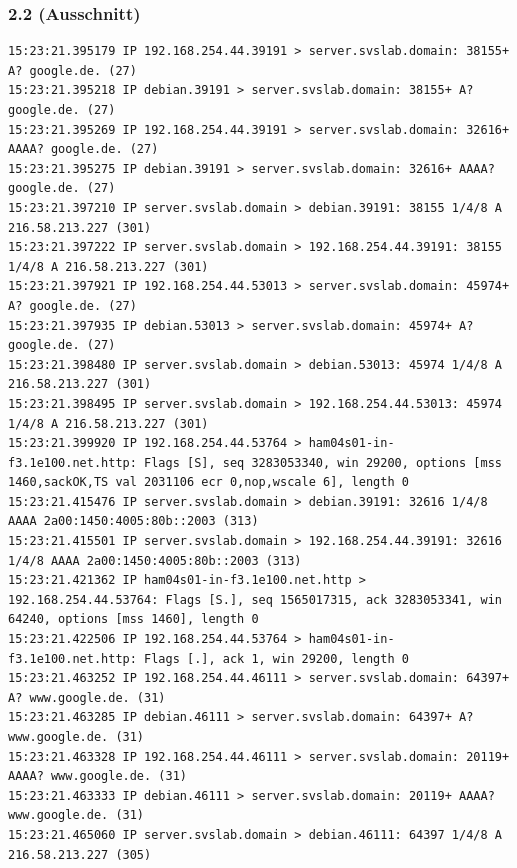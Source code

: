 \documentclass[12pt]{article}
\theoremstyle{plain}
\begin{document}
\subsubsection{2.2 (Ausschnitt)}
\begin{lstlisting}
15:23:21.395179 IP 192.168.254.44.39191 > server.svslab.domain: 38155+ A? google.de. (27)
15:23:21.395218 IP debian.39191 > server.svslab.domain: 38155+ A? google.de. (27)
15:23:21.395269 IP 192.168.254.44.39191 > server.svslab.domain: 32616+ AAAA? google.de. (27)
15:23:21.395275 IP debian.39191 > server.svslab.domain: 32616+ AAAA? google.de. (27)
15:23:21.397210 IP server.svslab.domain > debian.39191: 38155 1/4/8 A 216.58.213.227 (301)
15:23:21.397222 IP server.svslab.domain > 192.168.254.44.39191: 38155 1/4/8 A 216.58.213.227 (301)
15:23:21.397921 IP 192.168.254.44.53013 > server.svslab.domain: 45974+ A? google.de. (27)
15:23:21.397935 IP debian.53013 > server.svslab.domain: 45974+ A? google.de. (27)
15:23:21.398480 IP server.svslab.domain > debian.53013: 45974 1/4/8 A 216.58.213.227 (301)
15:23:21.398495 IP server.svslab.domain > 192.168.254.44.53013: 45974 1/4/8 A 216.58.213.227 (301)
15:23:21.399920 IP 192.168.254.44.53764 > ham04s01-in-f3.1e100.net.http: Flags [S], seq 3283053340, win 29200, options [mss 1460,sackOK,TS val 2031106 ecr 0,nop,wscale 6], length 0
15:23:21.415476 IP server.svslab.domain > debian.39191: 32616 1/4/8 AAAA 2a00:1450:4005:80b::2003 (313)
15:23:21.415501 IP server.svslab.domain > 192.168.254.44.39191: 32616 1/4/8 AAAA 2a00:1450:4005:80b::2003 (313)
15:23:21.421362 IP ham04s01-in-f3.1e100.net.http > 192.168.254.44.53764: Flags [S.], seq 1565017315, ack 3283053341, win 64240, options [mss 1460], length 0
15:23:21.422506 IP 192.168.254.44.53764 > ham04s01-in-f3.1e100.net.http: Flags [.], ack 1, win 29200, length 0
15:23:21.463252 IP 192.168.254.44.46111 > server.svslab.domain: 64397+ A? www.google.de. (31)
15:23:21.463285 IP debian.46111 > server.svslab.domain: 64397+ A? www.google.de. (31)
15:23:21.463328 IP 192.168.254.44.46111 > server.svslab.domain: 20119+ AAAA? www.google.de. (31)
15:23:21.463333 IP debian.46111 > server.svslab.domain: 20119+ AAAA? www.google.de. (31)
15:23:21.465060 IP server.svslab.domain > debian.46111: 64397 1/4/8 A 216.58.213.227 (305)
\end{lstlisting}
\end{document}
